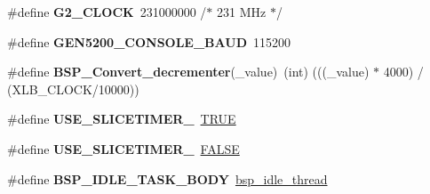 \begin{DoxyCompactItemize}
\#define {\bfseries G2\+\_\+\+C\+L\+O\+CK}~231000000  /$\ast$ 231 M\+Hz $\ast$/
\item 
\mbox{\label{group__RTEMSBSPsPowerPCGen5200_gaff540bfeade0d013052c3796919e6d59}} 
\#define {\bfseries G\+E\+N5200\+\_\+\+C\+O\+N\+S\+O\+L\+E\+\_\+\+B\+A\+UD}~115200
\item 
\mbox{\label{group__RTEMSBSPsPowerPCGen5200_ga5b3b7a8f2f89a6110c93e0229f67c104}} 
\#define {\bfseries B\+S\+P\+\_\+\+Convert\+\_\+decrementer}(\+\_\+value)~(int) (((\+\_\+value) $\ast$ 4000) / (X\+L\+B\+\_\+\+C\+L\+O\+CK/10000))
\item 
\mbox{\label{group__RTEMSBSPsPowerPCGen5200_ga75c80f8b45831f19db6ce62c1472704e}} 
\#define {\bfseries U\+S\+E\+\_\+\+S\+L\+I\+C\+E\+T\+I\+M\+E\+R\+\_}~\mbox{\hyperlink{group__RTEMSScoreBaseDefs_gaa8cecfc5c5c054d2875c03e77b7be15d}{T\+R\+UE}}
\item 
\mbox{\label{group__RTEMSBSPsPowerPCGen5200_ga009e1e1234f59c7131111381736025fc}} 
\#define {\bfseries U\+S\+E\+\_\+\+S\+L\+I\+C\+E\+T\+I\+M\+E\+R\+\_}~\mbox{\hyperlink{group__RTEMSScoreBaseDefs_gaa93f0eb578d23995850d61f7d61c55c1}{F\+A\+L\+SE}}
\item 
\mbox{\label{group__RTEMSBSPsPowerPCGen5200_ga4aa606d0badadcc28e8054cb60f13b56}} 
\#define {\bfseries B\+S\+P\+\_\+\+I\+D\+L\+E\+\_\+\+T\+A\+S\+K\+\_\+\+B\+O\+DY}~\mbox{\hyperlink{group__RTEMSBSPsSPARCLEON3_ga301be7085b80c41a9c5887247003c662}{bsp\+\_\+idle\+\_\+thread}}
\end{DoxyCompactItemize}
